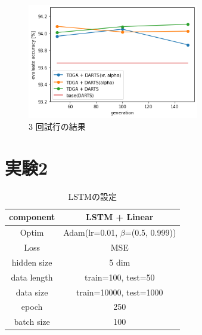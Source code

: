 \documentclass[twocolumn]{jarticle}     %
\begin{document}
\begin{figure}[tb]
  \begin{center}
    \includegraphics[clip,width=75mm]{3com.png}
    \caption{3 回試行の結果}
    \label{fig:acc}
  \end{center}
\end{figure}


\section{実験2}

\begin{table}[tb]
  \begin{center}
    \caption{LSTMの設定}
    \begin{tabular}{|c|c|} \hline
      component & LSTM + Linear \\ \hline
      Optim & Adam(lr=0.01, $\beta$=(0.5, 0.999)) \\ \hline
      Loss & MSE \\ \hline
      hidden size & 5 dim \\ \hline
      data length & train=100, test=50 \\ \hline
      data size & train=10000, test=1000 \\ \hline
      epoch & 250 \\ \hline
      batch size & 100 \\ \hline
    \end{tabular}
    \label{tab:setting_lstm}
  \end{center}
\end{table}
\end{document}
